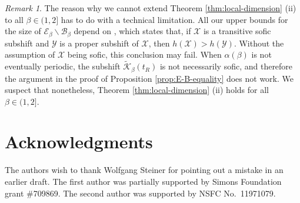 \documentclass[11pt]{amsart}
\theoremstyle{definition}
\theoremstyle{remark}
\newtheorem{remark}[theorem]{Remark}
\numberwithin{equation}{section}
\newcommand{\BB}{\mathscr{B}}
\newcommand{\EE}{\mathscr{E}}
\newcommand{\Kt}{\widetilde{\mathcal{K}}}
\newcommand{\al}{\alpha}
\begin{document}
\begin{remark}
The reason why we cannot extend Theorem \ref{thm:local-dimension} (ii) to all $\beta\in(1,2]$ has to do with a technical limitation. All our upper bounds for the size of $\EE_\beta\backslash\BB_\beta$ depend on \cite[Corollary 4.4.9]{Lind_Marcus_1995}, which states that, if $\mathcal{X}$ is a transitive sofic subshift and $\mathcal{Y}$ is a proper subshift of $\mathcal{X}$, then $h(\mathcal{X})>h(\mathcal{Y})$. Without the assumption of $\mathcal{X}$ being sofic, this conclusion may fail. When $\al(\beta)$ is not eventually periodic, the subshift $\Kt_\beta(t_R)$ is not necessarily sofic, and therefore the argument in the proof of Proposition \ref{prop:E-B-equality} does not work. We suspect that nonetheless, Theorem \ref{thm:local-dimension} (ii) holds for all $\beta\in(1,2]$.
\end{remark}

\section*{Acknowledgments}
{The authors wish to thank Wolfgang Steiner for pointing out a mistake in an earlier draft.}
The first author was partially supported by Simons Foundation grant \#709869.
The second author was supported by NSFC No.~11971079.
\end{document}
